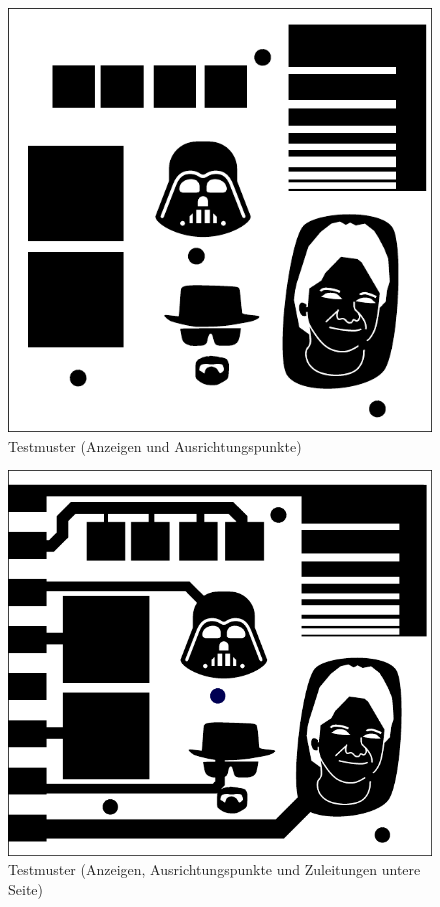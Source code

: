 \begin{figure}[t]
  \centering
  \includegraphics[width=\linewidth, keepaspectratio]{Bilder/testmuster}
  \caption{Testmuster (Anzeigen und Ausrichtungspunkte)}
  \label{testmuster}
\end{figure}

\begin{figure}[t]
  \centering
  \includegraphics[width=\linewidth, keepaspectratio]{Bilder/testmuster-seite1}
  \caption{Testmuster (Anzeigen, Ausrichtungspunkte und Zuleitungen untere Seite)}
  \label{testmuster-seite1}
\end{figure}

